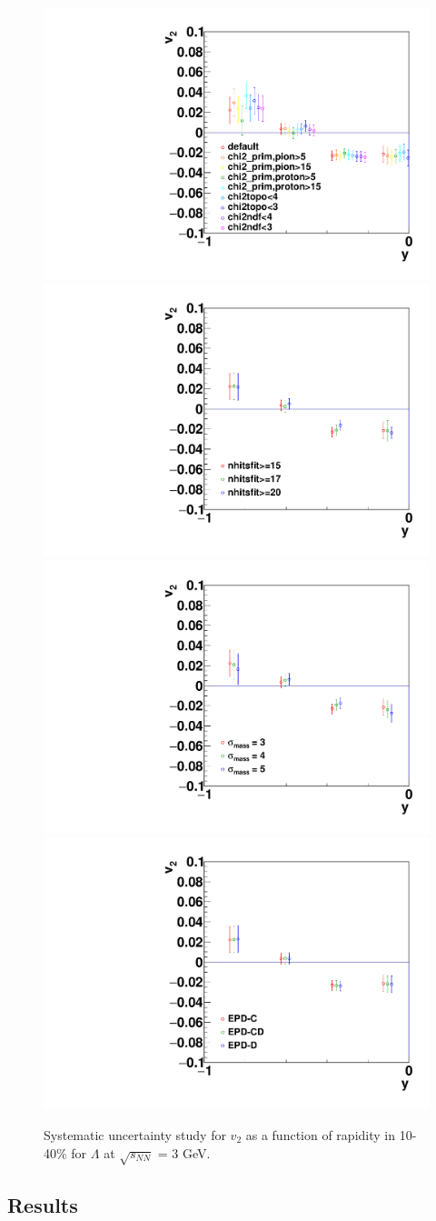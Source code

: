 \begin{figure}[h]
\includegraphics[width=0.49\linewidth]{chapterX/fig/ld_sys_cut_v2.pdf}
\includegraphics[width=0.49\linewidth]{chapterX/fig/ld_sys_cut_v2_nhits.pdf}
\includegraphics[width=0.49\linewidth]{FXT3gev/chapterX/fig/ld_sys_cut_v2_msigma.pdf}
\includegraphics[width=0.49\linewidth]{FXT3gev/chapterX/fig/ld_sys_cut_v2_epdres.pdf}
\caption{Systematic uncertainty study for $v_{2}$ as a function of rapidity in 10-40\% for $\Lambda$ at $\sqrt{s_{NN}}$ = 3 GeV.}
\label{lambda_v2y_sys}
\end{figure}




\subsection{Results}
